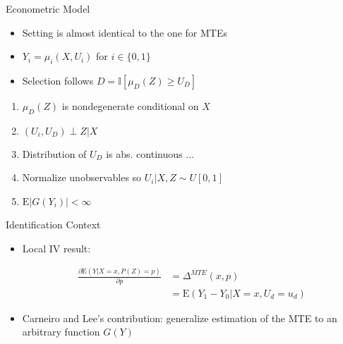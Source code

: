 \documentclass{beamer}
\newcommand{\E}{\mathrm{E}} %
\begin{document}
\begin{frame}{Econometric Model} %

\begin{itemize}

\item Setting is almost identical to the one for MTEs

\item $Y_i = \mu_i(X, U_i)$ for $i \in \{0, 1\}$

\item Selection follows $D = \mathbb{I}[ \mu_D(Z) \geq U_D ]$

\end{itemize}

\pause

\begin{enumerate}

\item $\mu_D(Z)$ is nondegenerate conditional on $X$

\item $(U_i, U_D) \perp Z | X$

\item Distribution of $U_D$ is abs. continuous $\dots$

\item Normalize unobservables so $U_i | X, Z \sim U[0, 1]$

\pause

\item $\E | G(Y_i) | < \infty$

\end{enumerate}

\end{frame}


\begin{frame}{Identification Context}

\begin{itemize}

\item Local IV result:

\begin{align*}
  \frac{\partial \E \left( Y | X = x, P(Z) = p \right) }{\partial p} &= \Delta^{MTE}(x, p) \\
  &= \E \left( Y_1 - Y_0 | X = x, U_d = u_d \right)
\end{align*}

\pause

\item Carneiro and Lee's contribution: generalize estimation of the
  MTE to an arbitrary function $G(Y)$

\end{itemize}

\end{frame}
\end{document}

